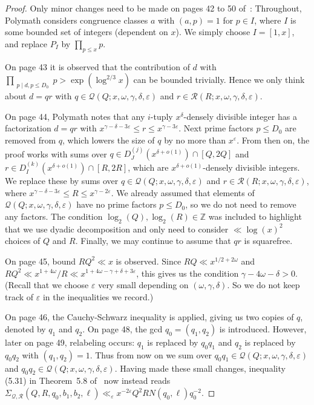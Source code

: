 \documentclass{amsart}
\numberwithin{equation}{section}
\begin{document}
\begin{proof}
Only   minor changes need to be made on pages 42 to 50 of~\cite{Polymath:2014:EDZ}: Throughout, Polymath considers congruence classes $a$ with $(a,p)=1$ for $p \in I$, where $I$ is some bounded set of integers (dependent on $x$). We simply choose $I=[1,x]$, and replace $P_I$ by $\prod_{p \leq x} p$.

\medskip


On page 43 it is observed that the contribution of $d$ with $ \prod_{\substack{ p \mid d,  p \leq D_0}} p > \exp(\log^{2/3} x)$ can be bounded trivially. Hence we only think about $d=qr$ with  $q \in \mathcal{Q}(Q;x,\omega,\gamma,\delta,\varepsilon)$ and $ r\in \mathcal{R}(R;x,\omega,\gamma,\delta,\varepsilon) $. 

\medskip
On page 44, Polymath notes that any $i$-tuply $x^\delta$-densely divisible integer has a factorization $d=qr$ with $ x^{\gamma-\delta -3\varepsilon} \leq r \leq  x^{\gamma - 3\varepsilon}  $. Next prime factors $p \leq D_0$ are removed from $q$, which lowers the size of $q$ by no more than $x^\varepsilon$. From then on, the proof works with sums over $q \in D_J^{(j)}(x^{\delta+o(1)}) \cap [Q,2Q]$ and $r \in D_I^{(k)}(x^{\delta+o(1)}) \cap [R,2R]$, which are $x^{\delta+o(1)}$-densely divisible integers. We replace these by sums over $q \in \mathcal{Q}(Q;x,\omega,\gamma,\delta,\varepsilon)$ and $ r\in \mathcal{R}(R;x,\omega,\gamma,\delta,\varepsilon) $, where   $ x^{\gamma-\delta -3\varepsilon} \leq R \leq  x^{\gamma - 2\varepsilon}  $. We already assumed that elements of $\mathcal{Q}(Q;x,\omega,\gamma,\delta,\varepsilon)$ have no prime factors $p \leq D_0$, so we do not need to remove any factors. The condition $\log_2(Q), \log_2(R) \in \mathbb{Z}$ was included to highlight that we use dyadic decomposition and only need to consider $\ll \log(x)^2$ choices of $Q$ and $R$. Finally, we may continue to assume that $qr$ is squarefree. 

\medskip On page 45, bound $RQ^2 \ll x$ is observed. Since $RQ \ll x^{1/2+2\omega}$ and $RQ^2 \ll x^{1+4\omega}/R \ll x^{1+4\omega -\gamma +\delta +3\varepsilon}$, this gives us the condition $\gamma-4\omega  -\delta  >0$. (Recall that we choose $\varepsilon$ very small depending on $(\omega,\gamma,\delta)$. So we do not keep track of $\varepsilon$ in the inequalities we record.) 

\medskip On page 46, the Cauchy-Schwarz inequality is applied, giving us two copies of $q$, denoted by $q_1$ and $q_2$. On page 48, the gcd $q_0 = (q_1,q_2)$ is introduced. However, later on page 49, relabeling occurs: $q_1$ is replaced by $q_0 q_1$ and $q_2$ is replaced by $q_0q_2$ with $(q_1,q_2)=1$. Thus from now on we   sum over  $q_0q_1 \in \mathcal{Q}(Q;x,\omega,\gamma,\delta,\varepsilon)$ and $q_0q_2 \in \mathcal{Q}(Q;x,\omega,\gamma,\delta,\varepsilon)$. Having made these small changes, inequality (5.31) in Theorem~5.8 of~\cite{Polymath:2014:EDZ} now instead reads $\Sigma_{\mathcal{Q}, \mathcal{R}}(Q,R,q_0,b_1,b_2,\ell) \ll_\varepsilon x^{-2\varepsilon} Q^2RN (q_0, \ell) q_0^{-2}.$
\end{proof}
\end{document}
